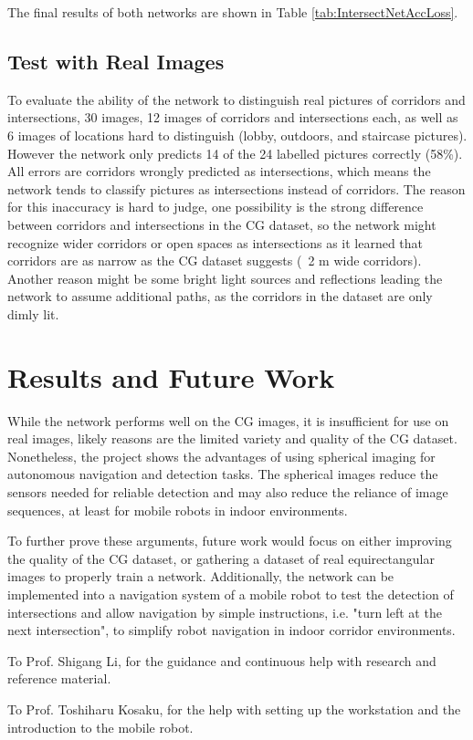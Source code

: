 \documentclass[sigconf, nonacm]{acmart}
\begin{document}
The final results of both networks are shown in Table \ref{tab:IntersectNetAccLoss}.

\subsection{Test with Real Images}
To evaluate the ability of the network to distinguish real pictures of corridors and intersections, 30 images, 12 images of corridors and intersections each, as well as 6 images of locations hard to distinguish (lobby, outdoors, and staircase pictures).
However the network only predicts 14 of the 24 labelled pictures correctly (58\%).
All errors are corridors wrongly predicted as intersections, which means the network tends to classify pictures as intersections instead of corridors.
The reason for this inaccuracy is hard to judge, one possibility is the strong difference between corridors and intersections in the CG dataset, so the network might recognize wider corridors or open spaces as intersections as it learned that corridors are as narrow as the CG dataset suggests (~2 m wide corridors).
Another reason might be some bright light sources and reflections leading the network to assume additional paths, as the corridors in the dataset are only dimly lit.

\section{Results and Future Work}
While the network performs well on the CG images, it is insufficient for use on real images, likely reasons are the limited variety and quality of the CG dataset.
Nonetheless, the project shows the advantages of using spherical imaging for autonomous navigation and detection tasks.
The spherical images reduce the sensors needed for reliable detection and may also reduce the reliance of image sequences, at least for mobile robots in indoor environments.

To further prove these arguments, future work would focus on either improving the quality of the CG dataset, or gathering a dataset of real equirectangular images to properly train a network.
Additionally, the network can be implemented into a navigation system of a mobile robot to test the detection of intersections and allow navigation by simple instructions, i.e. "turn left at the next intersection", to simplify robot navigation in indoor corridor environments.

\begin{acks}
To Prof. Shigang Li, for the guidance and continuous help with research and reference material.

To Prof. Toshiharu Kosaku, for the help with setting up the workstation and the introduction to the mobile robot.
\end{acks}
\end{document}
